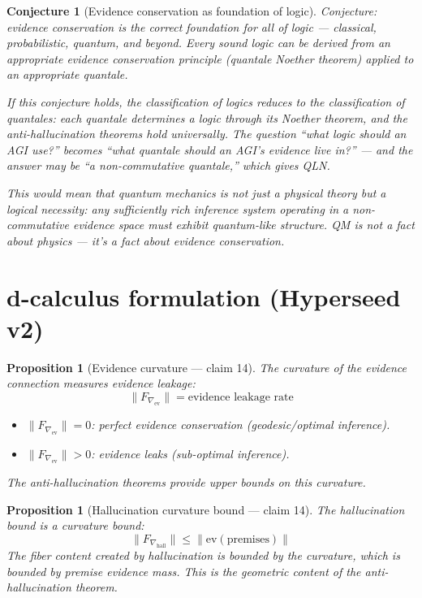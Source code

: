 \documentclass[11pt,a4paper]{article}
\newtheorem{proposition}[definition]{Proposition}
\newtheorem{conjecture}[definition]{Conjecture}
\begin{document}
\begin{conjecture}[Evidence conservation as foundation of logic]
Conjecture: evidence conservation is the correct foundation for all of
logic --- classical, probabilistic, quantum, and beyond. Every sound
logic can be derived from an appropriate evidence conservation principle
(quantale Noether theorem) applied to an appropriate quantale.

If this conjecture holds, the classification of logics reduces to the
classification of quantales: each quantale determines a logic through
its Noether theorem, and the anti-hallucination theorems hold
universally. The question ``what logic should an AGI use?'' becomes
``what quantale should an AGI's evidence live in?'' --- and the answer
may be ``a non-commutative quantale,'' which gives QLN.

This would mean that quantum mechanics is not just a physical theory
but a logical necessity: any sufficiently rich inference system operating
in a non-commutative evidence space must exhibit quantum-like structure.
QM is not a fact about physics --- it's a fact about evidence conservation.
\end{conjecture}

\section{d-calculus formulation (Hyperseed v2)}

\begin{proposition}[Evidence curvature --- claim 14]
\label{prop:curvature}
The curvature of the evidence connection measures evidence leakage:
\[
  \|F_{\nabla_{\text{ev}}}\| = \text{evidence leakage rate}
\]
\begin{itemize}
  \item $\|F_{\nabla_{\text{ev}}}\| = 0$: perfect evidence conservation
    (geodesic/optimal inference).
  \item $\|F_{\nabla_{\text{ev}}}\| > 0$: evidence leaks
    (sub-optimal inference).
\end{itemize}
The anti-hallucination theorems provide upper bounds on this curvature.
\end{proposition}

\begin{proposition}[Hallucination curvature bound --- claim 14]
\label{prop:hall_curv}
The hallucination bound is a curvature bound:
\[
  \|F_{\nabla_{\text{hall}}}\| \leq \|\text{ev}(\text{premises})\|
\]
The fiber content created by hallucination is bounded by the curvature,
which is bounded by premise evidence mass. This is the geometric content
of the anti-hallucination theorem.
\end{proposition}
\end{document}
